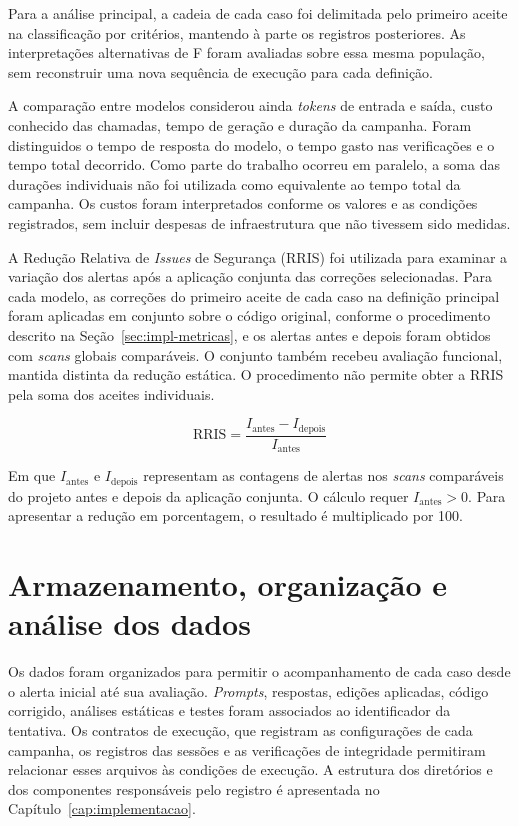Para a análise principal, a cadeia de cada caso foi delimitada pelo primeiro aceite na classificação por critérios, mantendo à parte os registros posteriores. As interpretações alternativas de F foram avaliadas sobre essa mesma população, sem reconstruir uma nova sequência de execução para cada definição.

A comparação entre modelos considerou ainda \textit{tokens} de entrada e saída, custo conhecido das chamadas, tempo de geração e duração da campanha. Foram distinguidos o tempo de resposta do modelo, o tempo gasto nas verificações e o tempo total decorrido. Como parte do trabalho ocorreu em paralelo, a soma das durações individuais não foi utilizada como equivalente ao tempo total da campanha. Os custos foram interpretados conforme os valores e as condições registrados, sem incluir despesas de infraestrutura que não tivessem sido medidas.

A Redução Relativa de \textit{Issues} de Segurança (RRIS) foi utilizada para examinar a variação dos alertas após a aplicação conjunta das correções selecionadas. Para cada modelo, as correções do primeiro aceite de cada caso na definição principal foram aplicadas em conjunto sobre o código original, conforme o procedimento descrito na Seção~\ref{sec:impl-metricas}, e os alertas antes e depois foram obtidos com \textit{scans} globais comparáveis. O conjunto também recebeu avaliação funcional, mantida distinta da redução estática. O procedimento não permite obter a RRIS pela soma dos aceites individuais.

\[
\text{RRIS} = \frac{I_{\text{antes}} - I_{\text{depois}}}{I_{\text{antes}}}
\]

Em que $I_{\text{antes}}$ e $I_{\text{depois}}$ representam as contagens de alertas nos \textit{scans} comparáveis do projeto antes e depois da aplicação conjunta. O cálculo requer $I_{\text{antes}} > 0$. Para apresentar a redução em porcentagem, o resultado é multiplicado por 100.

\section{Armazenamento, organização e análise dos dados}
\label{sec:met-dados}

Os dados foram organizados para permitir o acompanhamento de cada caso desde o alerta inicial até sua avaliação. \textit{Prompts}, respostas, edições aplicadas, código corrigido, análises estáticas e testes foram associados ao identificador da tentativa. Os contratos de execução, que registram as configurações de cada campanha, os registros das sessões e as verificações de integridade permitiram relacionar esses arquivos às condições de execução. A estrutura dos diretórios e dos componentes responsáveis pelo registro é apresentada no Capítulo~\ref{cap:implementacao}.

